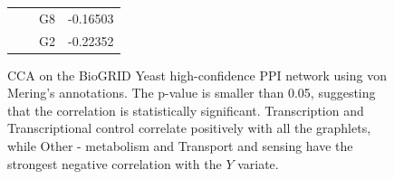 \begin{figure}[H]
\begin{tabular}{ c c | c c }
 & &  G8 & -0.16503\\
 & &  G2 & -0.22352\\
\end{tabular}
\caption[CCA on the BioGRID Yeast high-confidence PPI network -- von Mering's annotations]{CCA on the BioGRID Yeast high-confidence PPI network using von Mering's annotations. The p-value is smaller than 0.05, suggesting that the correlation is statistically significant. Transcription and Transcriptional control correlate positively with all the graphlets, while Other - metabolism and Transport and sensing have the strongest negative correlation with the $Y$ variate.}
\label{all_ppi17}
\end{figure}

